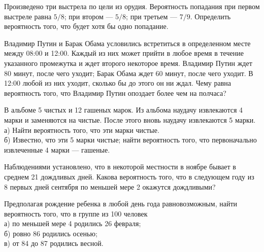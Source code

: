 \newpage\setcounter{zad}{0}



\begin{zkrW}{20}\noindent 
	Произведено три выстрела по цели из орудия. Вероятность попадания при первом выстреле равна $5/8$; при втором --- $5/8$; при третьем --- $7/9$. Определить вероятность того, что будет хотя бы одно попадание.
 
\end{zkrW}

\begin{zkrW}{20}\noindent 
	Владимир Путин и Барак Обама условились встретиться в определенном месте между 08:00 и 12:00. Каждый из них может прийти в любое время в течение указанного промежутка и ждет второго некоторое время. Владимир Путин ждет 80 минут, после чего уходит; Барак Обама ждет 60 минут, после чего уходит. В 12:00 любой из них уходит, сколько бы до этого он ни ждал. Чему равна вероятность того, что Владимир Путин опоздает более чем на полчаса?
 
\end{zkrW}

\begin{zkrW}{20}\noindent 
	В альбоме 5 чистых и 12 гашеных марок. Из альбома наудачу извлекаются 4 марки и заменяются на чистые. После этого вновь наудачу извлекаются 5 марки. \\ \indent а) Найти вероятность того, что эти марки чистые. \\ \indent б) Известно, что эти 5 марки чистые; найти вероятность того, что первоначально извлеченные 4 марки --- гашеные.
 
\end{zkrW}

\begin{zkrW}{20}\noindent 
	Наблюдениями установлено, что в некоторой местности в ноябре бывает в среднем 21 дождливых дней. Какова вероятность того, что в следующем году из 8 первых дней сентября по меньшей мере 2 окажутся дождливыми?
 
\end{zkrW}

\begin{zkrW}{20}\noindent 
	Предполагая рождение ребенка в любой день года равновозможным, найти вероятность того, что в группе из 100 человек \\ \indent а) по меньшей мере 4 родились 26 февраля; \\ \indent б) ровно 86 родились осенью; \\ \indent в) от 84 до 87 родились весной.
 
\end{zkrW}

